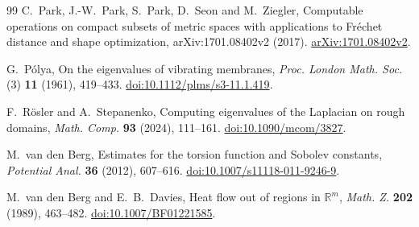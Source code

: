 \documentclass[11pt,reqno]{amsart}
\numberwithin{equation}{section}
\newcommand{\R}{\mathbb R}
\begin{document}
\begin{thebibliography}{99}
C.~Park, J.-W.~Park, S.~Park, D.~Seon and M.~Ziegler,
Computable operations on compact subsets of metric spaces with
applications to Fr\'echet distance and shape optimization,
arXiv:1701.08402v2 (2017).
\href{https://arxiv.org/abs/1701.08402v2}{arXiv:1701.08402v2}.

G.~P\'olya,
On the eigenvalues of vibrating membranes,
\emph{Proc. London Math. Soc.} (3) \textbf{11} (1961), 419--433.
\href{https://doi.org/10.1112/plms/s3-11.1.419}{doi:10.1112/plms/s3-11.1.419}.

F.~R\"osler and A.~Stepanenko,
Computing eigenvalues of the Laplacian on rough domains,
\emph{Math. Comp.} \textbf{93} (2024), 111--161.
\href{https://doi.org/10.1090/mcom/3827}{doi:10.1090/mcom/3827}.

M.~van den Berg,
Estimates for the torsion function and Sobolev constants,
\emph{Potential Anal.} \textbf{36} (2012), 607--616.
\href{https://doi.org/10.1007/s11118-011-9246-9}
{doi:10.1007/s11118-011-9246-9}.

M.~van den Berg and E.~B.~Davies,
Heat flow out of regions in \(\R^m\),
\emph{Math. Z.} \textbf{202} (1989), 463--482.
\href{https://doi.org/10.1007/BF01221585}{doi:10.1007/BF01221585}.

\end{thebibliography}
\end{document}
